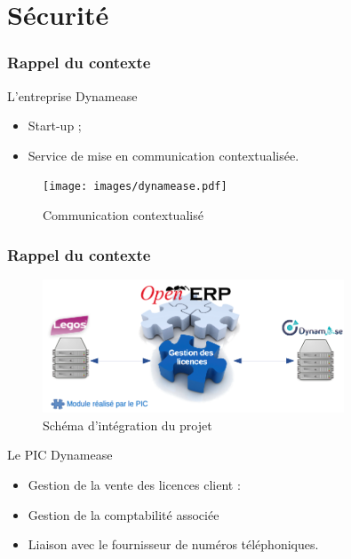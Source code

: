 \section{Sécurité}
\author{Kévin Moreau}


\begin{frame}
	\frametitle{Rappel du contexte}

	\begin{block}{L'entreprise Dynamease}
	 \begin{itemize}
      \item Start-up ;
	  \item Service de mise en communication contextualisée.
	 \end{itemize}
	\end{block}

    \begin{center}
	  \begin{figure}
        \texttt{[image: images/dynamease.pdf]}
	   \caption{Communication contextualisé}
	  \end{figure}
	\end{center}
\end{frame}

\begin{frame}
	\frametitle{Rappel du contexte}
	
	\begin{center}
	  \begin{figure}
	   \includegraphics[width=0.80\textwidth]{images/schemaGlobal.png}
	   \caption{Schéma d'intégration du projet}
	  \end{figure}
	\end{center}

    \begin{block}{Le PIC Dynamease}
	 \begin{itemize}
	  \item Gestion de la vente des licences client :
      \item Gestion de la comptabilité associée
	  \item Liaison avec le fournisseur de numéros téléphoniques.
	 \end{itemize}
	\end{block}

\end{frame}


